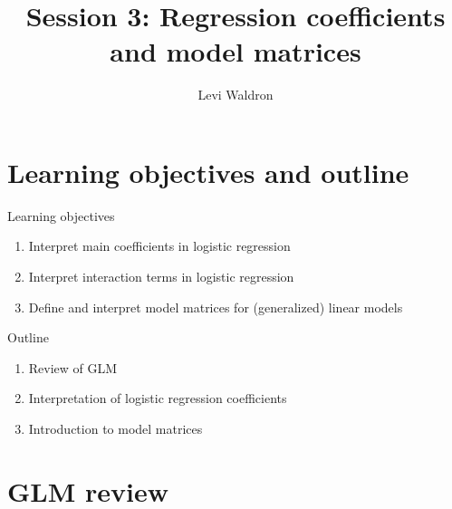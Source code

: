 \documentclass[
  ignorenonframetext,
]{beamer}
\title{Session 3: Regression coefficients and model matrices}
\author{Levi Waldron}
\date{}
\institute{CUNY SPH Biostatistics 2}
\providecommand{\tightlist}{%
  \setlength{\itemsep}{0pt}\setlength{\parskip}{0pt}}
\begin{document}
\frame{\titlepage}

\hypertarget{learning-objectives-and-outline}{%
\section{Learning objectives and
outline}\label{learning-objectives-and-outline}}

\begin{frame}{Learning objectives}
\protect\hypertarget{learning-objectives}{}

\begin{enumerate}
\tightlist
\item
  Interpret main coefficients in logistic regression
\item
  Interpret interaction terms in logistic regression
\item
  Define and interpret model matrices for (generalized) linear models
\end{enumerate}

\end{frame}

\begin{frame}{Outline}
\protect\hypertarget{outline}{}

\begin{enumerate}
\tightlist
\item
  Review of GLM
\item
  Interpretation of logistic regression coefficients
\item
  Introduction to model matrices
\end{enumerate}

\end{frame}

\hypertarget{glm-review}{%
\section{GLM review}\label{glm-review}}
\end{document}
